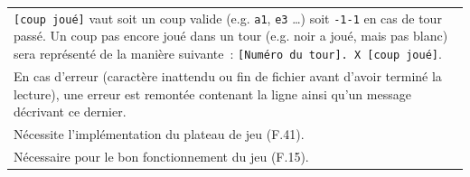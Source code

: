 \documentclass[a4paper,12pt]{article}
\begin{document}
\begin{tabularx}{\textwidth}{|X|}
    \texttt{[coup joué]} vaut soit un coup valide (e.g. \texttt{a1}, \texttt{e3} \ldots) soit \texttt{-1-1} en cas de tour passé. Un coup pas encore joué dans un tour (e.g. noir a joué, mais pas blanc) sera représenté de la manière suivante~: \texttt{[Numéro du tour]. X [coup joué]}. \\
    En cas d’erreur (caractère inattendu ou fin de fichier avant d’avoir terminé la lecture), une erreur est remontée contenant la ligne ainsi qu’un message décrivant ce dernier.                                                                                                           \\
    \hline
    Nécessite l’implémentation du plateau de jeu (F.41).                                                                                                                                                                                                                                     \\
    Nécessaire pour le bon fonctionnement du jeu (F.15).                                                                                                                                                                                                                                     \\
    \hline
\end{tabularx}

\vspace{1cm}
\end{document}
